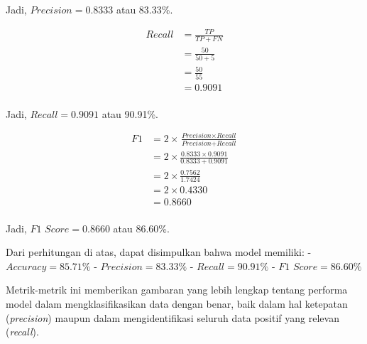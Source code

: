 Jadi, \(\textit{Precision} = 0.8333\) atau 83.33\%.


\begin{align*}
    \textit{Recall} &= \frac{TP}{TP + FN} \\
    &= \frac{50}{50 + 5} \\
    &= \frac{50}{55} \\
    &= 0.9091\\
\end{align*}

Jadi, \(\textit{Recall} = 0.9091\) atau 90.91\%.


\begin{align*}
    \textit{F1} &= 2 \times \frac{\textit{Precision} \times \textit{Recall}}{\textit{Precision} + \textit{Recall}} \\
    &= 2 \times \frac{0.8333 \times 0.9091}{0.8333 + 0.9091} \\
    &= 2 \times \frac{0.7562}{1.7424} \\
    &= 2 \times 0.4330 \\
    &= 0.8660\\
\end{align*}

Jadi, \(\textit{F1 Score} = 0.8660\) atau 86.60\%.

\medskip
Dari perhitungan di atas, dapat disimpulkan bahwa model memiliki:
- \(\textit{Accuracy} = 85.71\%\)
- \(\textit{Precision} = 83.33\%\)
- \(\textit{Recall} = 90.91\%\)
- \(\textit{F1 Score} = 86.60\%\)

Metrik-metrik ini memberikan gambaran yang lebih lengkap tentang performa model dalam mengklasifikasikan data dengan benar, baik dalam hal ketepatan (\textit{precision}) maupun dalam mengidentifikasi seluruh data positif yang relevan (\textit{recall}).
